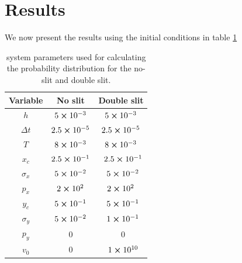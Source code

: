 \documentclass[english,notitlepage,reprint,nofootinbib]{revtex4-2}  %
\begin{document}
	


	
	
	\section{Results}\label{sec:results}
	We now present the results using the initial conditions in table \ref{tab:1}
	\begin{table}[h!]
	\centering
	\caption{system parameters used for calculating the probability distribution for the no-slit and double slit.}
	\label{tab:1}
	\begin{tabular}{c | c | c} %
	 Variable& No slit & Double slit\\
	\hline
	$h$                & $5\cross10^{-3}$                &\quad $5\cross10^{-3}$   \\
	$\Delta t$       & $2.5\cross10^{-5}$            &\quad $2.5\cross10^{-5}$  \\
	$T$                & $8\cross10^{-3}$               &\quad $8\cross10^{-3}$     \\
	$x_c$             & $2.5\cross10^{-1}$            &\quad $2.5\cross10^{-1}$  \\
	$\sigma_x$    & $5\cross10^{-2}$               &\quad $5\cross10^{-2}$     \\
	$p_x$             & $2\cross10^{2}$                &\quad $2\cross10^{2}$      \\
	$y_c$             & $5\cross10^{-1}$               &\quad $5\cross10^{-1}$     \\
	$\sigma_y$    & $5\cross10^{-2}$               &\quad $1\cross10^{-1}$     \\
	$p_y$             & $0$                                    &\quad $0$                         \\
	$v_0$             & $0$                                    &\quad $1\cross10^{10}$    \\
	\hline
	\end{tabular}
	\end{table}
	
	
	
\end{document}
